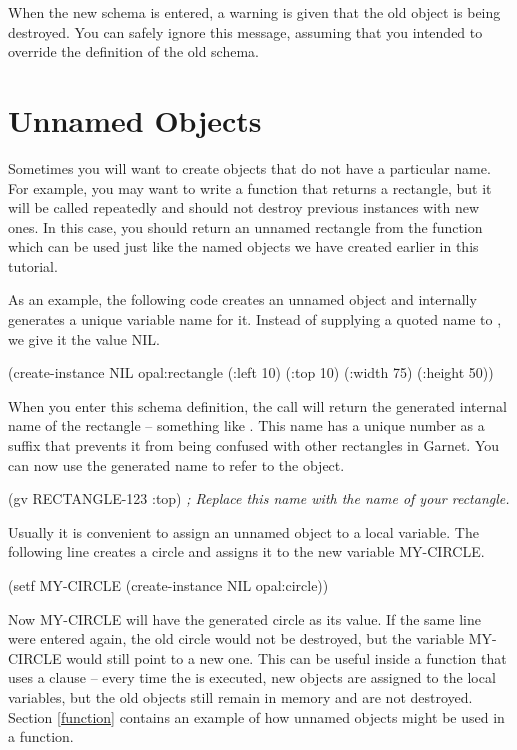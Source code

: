 When the new schema is entered, a warning is given that the old object
is being destroyed.  You can safely ignore this message, assuming that
you intended to override the definition of the old schema.


\section{Unnamed Objects}
\label{unnamed-objects}

Sometimes you will want to create objects that do not have a
particular name.  For example, you may want to write a function that
returns a rectangle, but it will be called repeatedly and should not destroy
previous instances with new ones.  In this case, you should return an
unnamed rectangle from the function which can be used just like the
named objects we have created earlier in this tutorial.

As an example, the following code creates an
unnamed object and internally generates a unique variable name for it.
Instead of supplying a quoted name to , we give it
the value NIL.

\begin{programexample}
(create-instance NIL opal:rectangle
   (:left 10) (:top 10) (:width 75) (:height 50))
\end{programexample}

When you enter this schema definition, the  call
will return the generated internal name of the rectangle -- something like
.  This name has a unique number as a
suffix that prevents it from being confused with other rectangles in
Garnet.  You can now use the generated name to refer to the object.

\begin{programexample}
(gv RECTANGLE-123 :top)  {\it ; Replace this name with the name of your rectangle.}
\end{programexample}

Usually it is convenient to assign an unnamed object to a local
variable.  The following line creates a circle and assigns it to the
new variable MY-CIRCLE.

\begin{programexample}
(setf MY-CIRCLE (create-instance NIL opal:circle))
\end{programexample}

Now MY-CIRCLE will have the generated circle as its value.  If the
same line were entered again, the old circle would not be destroyed,
but the variable MY-CIRCLE would still point to a new one.  This can
be useful inside a function that uses a  clause -- every time
the  is executed, new objects are assigned to the local
variables, but the old objects still remain in memory and are not
destroyed. Section \ref{function} contains an example of how unnamed
objects might be used in a function.


